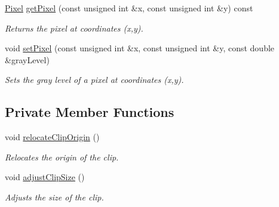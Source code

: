 \begin{CompactItemize}
\hyperlink{class_pixel}{Pixel} \hyperlink{class_clip_260bfb94abaa9d2df692ba33146cc62e}{getPixel} (const unsigned int \&x, const unsigned int \&y) const 
\begin{CompactList}\small\item\em Returns the pixel at coordinates (x,y). \item\end{CompactList}\item 
void \hyperlink{class_clip_cf9dc38eade61776c6c8497f2ce53b7b}{setPixel} (const unsigned int \&x, const unsigned int \&y, const double \&grayLevel)
\begin{CompactList}\small\item\em Sets the gray level of a pixel at coordinates (x,y). \item\end{CompactList}\end{CompactItemize}
\subsection*{Private Member Functions}
\begin{CompactItemize}
\item 
void \hyperlink{class_clip_66fc93c15de96d077d2242a53576528e}{relocateClipOrigin} ()
\begin{CompactList}\small\item\em Relocates the origin of the clip. \item\end{CompactList}\item 
void \hyperlink{class_clip_e050cf90340e9160f79688627d69a00b}{adjustClipSize} ()
\begin{CompactList}\small\item\em Adjusts the size of the clip. \item\end{CompactList}\end{CompactItemize}
